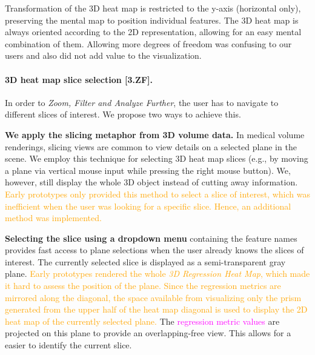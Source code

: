 \documentclass[journal]{style/vgtc} 			          %
\newcommand{\design}[1]{\textcolor{orange}{#1}}
\newcommand{\magenta}[1]{\textcolor{magenta}{#1}}
\begin{document}
Transformation of the 3D heat map is restricted to the y-axis (horizontal only), preserving the mental map to position individual features.
The 3D heat map is always oriented according to the 2D representation, allowing for an easy mental combination of them.
Allowing more degrees of freedom was confusing to our users and also did not add value to the visualization.
\paragraph{3D heat map slice selection [\textbf{3.ZF}].}
In order to \emph{Zoom, Filter and Analyze Further}, the user has to navigate to different slices of interest.
We propose two ways to achieve this.

	\textbf{We apply the slicing metaphor from 3D volume data.}
	In medical volume renderings, slicing views are common to view details on a selected plane in the scene.
	We employ this technique for selecting 3D heat map slices (e.g., by moving a plane via vertical mouse input while pressing the right mouse button).
	We, however, still display the whole 3D object instead of cutting away information. %
	\design{Early prototypes only provided this method to select a slice of interest, which was inefficient when the user was looking for a specific slice.
	Hence, an additional method was implemented.
	}

	\textbf{Selecting the slice using a dropdown menu} containing the feature names provides fast access to plane selections when the user already knows the slices of interest.
The currently selected slice is displayed as a semi-transparent gray plane.
\design{
Early prototypes rendered the whole \emph{3D Regression Heat Map}, which made it hard to assess the position of the plane.
Since the regression metrics are mirrored along the diagonal, the space available from visualizing only the prism generated from the upper half of the heat map diagonal is used to display the 2D heat map of the currently selected plane.
}
The \magenta{regression metric values} are projected on this plane to provide an overlapping-free view.
This allows for a easier to identify the current slice.
\end{document}
